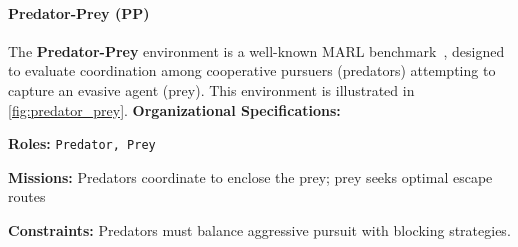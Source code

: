 \documentclass[pdflatex,sn-mathphys-num]{sn-jnl}%
\theoremstyle{thmstyleone}%
\theoremstyle{thmstyletwo}%
\theoremstyle{thmstylethree}%
\begin{document}
\paragraph{Predator-Prey (PP)}
The \textbf{Predator-Prey} environment is a well-known MARL benchmark~\cite{lowe2017multi}, designed to evaluate coordination among cooperative pursuers (predators) attempting to capture an evasive agent (prey). This environment is illustrated in \autoref{fig:predator_prey}.
%
%
\textbf{Organizational Specifications:}
\begin{enumerate*}[label={\roman*)}, itemjoin={; \quad}]
    \item \textbf{Roles:} \texttt{Predator, Prey}
    \item \textbf{Missions:} Predators coordinate to enclose the prey; prey seeks optimal escape routes
    \item \textbf{Constraints:} Predators must balance aggressive pursuit with blocking strategies.
\end{enumerate*}
%
\end{document}
